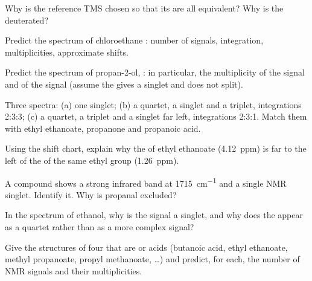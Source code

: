 \begin{exercise}[$\star$]\label{exo:g12:proton-nmr:5}
Why is the reference TMS chosen so that its  are all equivalent?
Why is the  deuterated?
\end{exercise}

\begin{exercise}[$\star\star$]\label{exo:g12:proton-nmr:6}
Predict the spectrum of chloroethane : number of signals,
integration, multiplicities, approximate shifts.
\end{exercise}

\begin{exercise}[$\star\star$]\label{exo:g12:proton-nmr:7}
Predict the spectrum of propan-2-ol, : in particular, the
multiplicity of the  signal and of the  signal (assume the
 gives a singlet and does not split).
\end{exercise}

\begin{exercise}[$\star\star$]\label{exo:g12:proton-nmr:8}
Three spectra: (a) one singlet; (b) a quartet, a singlet and a triplet,
integrations 2:3:3; (c) a quartet, a triplet and a singlet far left,
integrations 2:3:1. Match them with ethyl ethanoate, propanone and
propanoic acid.
\end{exercise}

\begin{exercise}[$\star\star$]\label{exo:g12:proton-nmr:9}
Using the shift chart, explain why the  of ethyl ethanoate
(\qty{4.12}{ppm}) is far to the left of the  of the same ethyl
group (\qty{1.26}{ppm}).
\end{exercise}

\begin{exercise}[$\star\star$]\label{exo:g12:proton-nmr:10}
A compound  shows a strong infrared band at
\qty{1715}{cm^{-1}} and a single NMR singlet. Identify it. Why is propanal
excluded?
\end{exercise}

\begin{exercise}[$\star\star$]\label{exo:g12:proton-nmr:11}
In the spectrum of ethanol, why is the  signal a singlet, and why
does the  appear as a quartet rather than as a more complex
signal?
\end{exercise}

\begin{exercise}[$\star\star\star$]\label{exo:g12:proton-nmr:12}
Give the structures of four   that are  or acids
(butanoic acid, ethyl ethanoate, methyl propanoate, propyl methanoate,
\dots) and predict, for each, the number of NMR signals and their
multiplicities.
\end{exercise}


